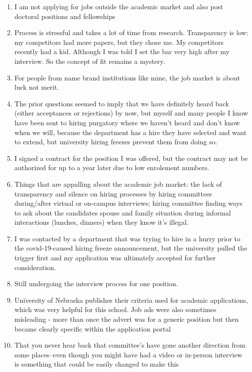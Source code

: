 \documentclass[]{article}
\begin{document}
\begin{enumerate}
\item
  I am not applying for jobs outside the academic market and also post
  doctoral positions and fellowships
\item
  Process is stressful and takes a lot of time from research.
  Transparency is low: my competitors had more papers, but they chose
  me. My competitors recently had a kid. Although I was told I set the
  bar very high after my interview. So the concept of fit remains a
  mystery.
\item
  For people from name brand institutions like mine, the job market is
  about luck not merit.
\item
  The prior questions seemed to imply that we have definitely heard back
  (either acceptances or rejections) by now, but myself and many people
  I know have been sent to hiring purgatory where we haven't heard and
  don't know when we will, because the department has a hire they have
  selected and want to extend, but university hiring freezes prevent
  them from doing so.
\item
  I signed a contract for the position I was offered, but the contract
  may not be authorized for up to a year later due to low enrolement
  numbers.
\item
  Things that are appalling about the academic job market: the lack of
  transparency and silence on hiring processes by hiring committees
  during/after virtual or on-campus interviews; hiring committee finding
  ways to ask about the candidates spouse and family situation during
  informal interactions (lunches, dinners) when they know it's illegal.
\item
  I was contacted by a department that was trying to hire in a hurry
  prior to the covid-19-caused hiring freeze announcement, but the
  university pulled the trigger first and my application was ultimately
  accepted for further consideration.
\item
  Still undergoing the interview process for one position.
\item
  University of Nebraska publishes their criteria used for academic
  applications, which was very helpful for this school. Job ads were
  also sometimes misleading - more than once the advert was for a
  generic position but then became clearly specific within the
  application portal
\item
  That you never hear back that committee's have gone another direction
  from some places--even though you might have had a video or in-person
  interview is something that could be easily changed to make this

\end{enumerate}
\end{document}
